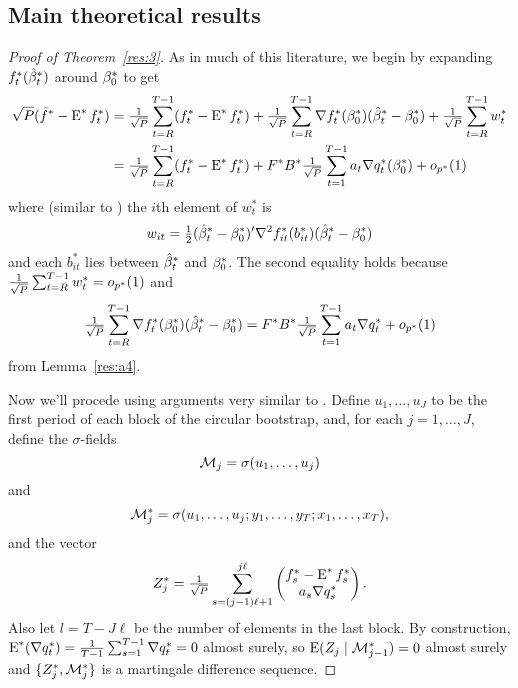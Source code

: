 \documentclass[12pt,fleqn]{article}
\begin{document}
\subsection{Main theoretical results}
\newcommand{\WesA}[1][]{\oclt{t}
  (F_t^{#1} - \E^{#1} F_t^{#1}) B^{#1} H_t^{#1}}
\newcommand{\WesB}[1][]{\tfrac{1}{\sqrt{P}} \E^{#1} F_t^{#1} \osum{t} (B_t^{#1} -
  B^{#1}) H_t^{#1}}
\newcommand{\WesC}[1][]{\oclt{t}
  (F_t^{#1} - \E^{#1} F_t^{#1}) (B_t^{#1} - B^{#1}) H_t^{#1}}
\begin{proof}[Proof of Theorem~\ref{res:3}]
  As in much of this literature, we begin by expanding
  $f_t^{*}(\hat \beta_t^*)$ around $\beta_0^*$ to get
  \begin{align*}
    \sqrt{P} (\bar f^* - \operatorname{E}^* f_t^*)
    &= \tfrac{1}{\sqrt{P}} \sum_{t=R}^{T-1} (f_t^{*} - \operatorname{E}^* f_t^*)
     + \tfrac{1}{\sqrt{P}} \sum_{t=R}^{T-1} \nabla f_t^*(\beta_0^*) (\hat \beta_t^* - \beta_0^*)
     + \tfrac{1}{\sqrt{P}} \sum_{t=R}^{T-1} w_t^* \\
    &= \tfrac{1}{\sqrt{P}} \sum_{t=R}^{T-1} (f_t^{*} - \operatorname{E}^* f_t^*)
     + F^* B^* \tfrac{1}{\sqrt{P}} \sum_{t=1}^{T-1} a_t \nabla q_t^*(\beta_0^*) + o_{p^*}(1)
  \end{align*}
  where (similar to \citealp{Wes:96}) the $i$th element of $w_t^*$ is
  \begin{equation*}
    w_{it} = \tfrac12 (\hat \beta_t^* - \beta_0^*)' \nabla^2 f_{it}^*(b_{it}^*) (\hat \beta_t^* - \beta_0^*)
  \end{equation*}
  and each $b_{it}^*$ lies between $\hat \beta_t^*$ and $\beta_0^*$. The second equality holds because
  $\tfrac{1}{\sqrt{P}} \sum_{t=R}^{T-1} w_t^* = o_{p^*}(1)$ and
  \begin{equation*}
    \tfrac{1}{\sqrt{P}} \sum_{t=R}^{T-1} \nabla f_t^*(\beta_0^*) (\hat \beta_t^* - \beta_0^*)
    = F^* B^* \tfrac{1}{\sqrt{P}} \sum_{t=1}^{T-1} a_t \nabla q_t^* + o_{p^*}(1)
  \end{equation*}
  from Lemma~\ref{res:a4}.

  Now we'll procede using arguments very similar to
  \cite{Cal:14}. Define $u_1,\dots,u_J$ to be the first period of each
  block of the circular bootstrap, and, for each $j = 1,\dots,J$,
  define the $\sigma$-fields
  \[
  \mathcal{M}_j = \sigma(u_1,\dots,u_j)
  \]
  and
  \[
  \mathcal{M}_j^* = \sigma(u_1,\dots,u_j; y_1,\dots,y_T; x_1,\dots,x_T),
  \]
  and the vector
  \[
  Z_j^* = \tfrac{1}{\sqrt{P}} \sum_{s=(j-1) \ell + 1}^{j\ell}
  \begin{pmatrix}
    f_s^* - \operatorname{E}^* f_s^* \\
    a_s \nabla q_s^*
  \end{pmatrix}.
  \]
  Also let $l = T - J \ell$ be the number of elements in the last block.
  By construction, $\operatorname{E}^*(\nabla q_t^*) = \tfrac{1}{T-1}
  \sum_{s=1}^{T-1} \nabla q_t^* = 0$ almost surely, so $\operatorname{E}(Z_j \mid
  \mathcal{M}_{j-1}^*) = 0$ almost surely and $\{Z_j^*, \mathcal{M}_j^*\}$ is a
  martingale difference sequence.


\end{proof}
\end{document}
